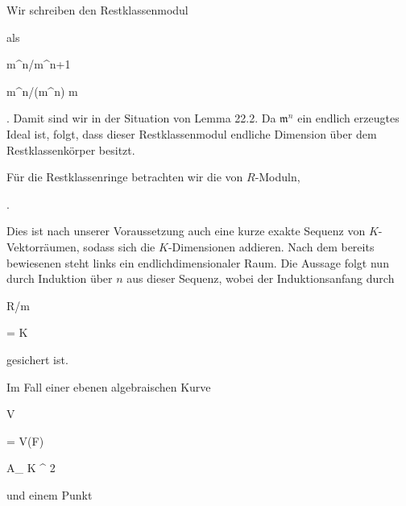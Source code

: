{


Wir schreiben den Restklassenmodul

 als


\mavergleichskettedisp

{\vergleichskette

{ {\mathfrak m}^n/{\mathfrak m}^{n+1}
}

{ \cong} { {\mathfrak m}^n/({\mathfrak m}^{n}) {\mathfrak m}
}

{ } {
}

{ } {
}

{ } {
}

}
{}{}{.}
Damit sind wir in der Situation von
Lemma 22.2.
Da ${\mathfrak m}^n$ ein endlich erzeugtes Ideal ist, folgt, dass dieser Restklassenmodul endliche Dimension über dem Restklassenkörper besitzt.


Für die Restklassenringe betrachten wir die
von $R$-Moduln,


 { . }


Dies ist nach unserer Voraussetzung auch eine kurze exakte Sequenz von $K$-Vektorräumen, sodass sich die $K$-Dimensionen addieren. Nach dem bereits bewiesenen steht links ein endlichdimensionaler Raum. Die Aussage folgt nun durch Induktion über $n$ aus dieser Sequenz, wobei der Induktionsanfang durch


\mavergleichskette

{\vergleichskette

{ R/{\mathfrak m}
}

{ = }{ K
}

{  }{
}

{    }{
}

{   }{
}

}
{}{}{}
gesichert ist.


}


Im Fall einer ebenen algebraischen Kurve


\mavergleichskette

{\vergleichskette

{ V
}

{ = }{ V(F)
}

{ \subset }{ { {\mathbb A}_{ K }^{ 2  } }
}

{    }{
}

{   }{
}

}
{}{}{}
und einem Punkt


